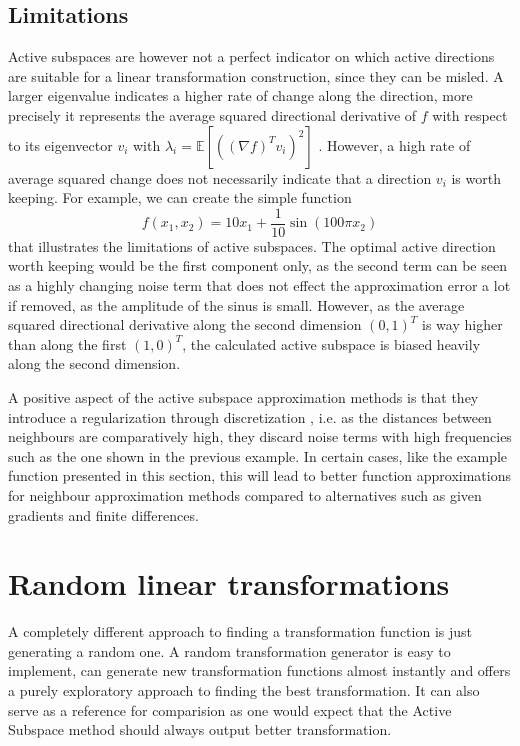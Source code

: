 \documentclass[
  a4paper,  %
  twoside,  %
  bibliography=totoc,
  headsepline,
  cleardoublepage=empty,
  parskip=half,
  draft=false
]{scrbook}
\begin{document}
\subsection{Limitations}
\label{sec:asl}

Active subspaces are however not a perfect indicator on which active directions are suitable for a linear transformation construction, since they can be misled.
A larger eigenvalue indicates a higher rate of change along the direction, more precisely it represents the average squared directional derivative of $f$ with respect to its eigenvector $v_i$ with $\lambda_i=\mathds{E}[((\nabla f)^T v_i)^2]$ \cite{CG14}.
However, a high rate of average squared change does not necessarily indicate that a direction $v_i$ is worth keeping.
For example, we can create the simple function
\begin{equation}
f(x_1, x_2)=10x_1 + \frac{1}{10} \sin(100 \pi x_2)
\end{equation}
that illustrates the limitations of active subspaces.
The optimal active direction worth keeping would be the first component only, as the second term can be seen as a highly changing noise term that does not effect the approximation error a lot if removed, as the amplitude of the sinus is small.
However, as the average squared directional derivative along the second dimension $(0,1)^T$ is way higher than along the first $(1,0)^T$, the calculated active subspace is biased heavily along the second dimension.

A positive aspect of the active subspace approximation methods is that they introduce a regularization through discretization \cite{Kress1999}, i.e. as the distances between neighbours are comparatively high, they discard noise terms with high frequencies such as the one shown in the previous example.
In certain cases, like the example function presented in this section, this will lead to better function approximations for neighbour approximation methods compared to alternatives such as given gradients and finite differences.

\section{Random linear transformations}
\label{sec:rt}

A completely different approach to finding a transformation function is just generating a random one.
A random transformation generator is easy to implement, can generate new transformation functions almost instantly and offers a purely exploratory approach to finding the best transformation.
It can also serve as a reference for comparision as one would expect that the Active Subspace method should always output better transformation.
\end{document}
